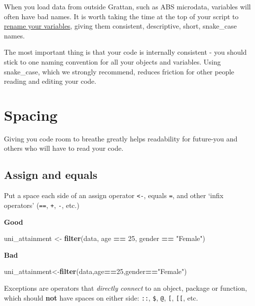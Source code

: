 \documentclass[]{book}
\newenvironment{Shaded}{\begin{snugshade}}{\end{snugshade}}
\newcommand{\DecValTok}[1]{\textcolor[rgb]{0.00,0.00,0.81}{#1}}
\newcommand{\KeywordTok}[1]{\textcolor[rgb]{0.13,0.29,0.53}{\textbf{#1}}}
\newcommand{\NormalTok}[1]{#1}
\newcommand{\OperatorTok}[1]{\textcolor[rgb]{0.81,0.36,0.00}{\textbf{#1}}}
\newcommand{\StringTok}[1]{\textcolor[rgb]{0.31,0.60,0.02}{#1}}
\begin{document}
When you load data from outside Grattan, such as ABS microdata, variables will often have bad names. It is worth taking the time at the top of your script to \href{https://dplyr.tidyverse.org/reference/select.html}{rename your variables}, giving them consistent, descriptive, short, snake\_case names.

The most important thing is that your code is internally consistent - you should stick to one naming convention for all your objects and variables. Using snake\_case, which we strongly recommend, reduces friction for other people reading and editing your code.

\hypertarget{spacing}{%
\chapter{Spacing}\label{spacing}}

Giving you code room to breathe greatly helps readability for future-you and others who will have to read your code.

\hypertarget{assign-and-equals}{%
\section{Assign and equals}\label{assign-and-equals}}

Put a space each side of an assign operator \texttt{\textless{}-}, equals \texttt{=}, and other `infix operators' (\texttt{==}, \texttt{+}, \texttt{-}, etc.)

\textbf{Good}

\begin{Shaded}
\begin{Highlighting}[]
\NormalTok{uni_attainment <-}\StringTok{ }\KeywordTok{filter}\NormalTok{(data, age }\OperatorTok{==}\StringTok{ }\DecValTok{25}\NormalTok{, gender }\OperatorTok{==}\StringTok{ "Female"}\NormalTok{)}
\end{Highlighting}
\end{Shaded}

\textbf{Bad}

\begin{Shaded}
\begin{Highlighting}[]
\NormalTok{uni_attainment<-}\KeywordTok{filter}\NormalTok{(data,age}\OperatorTok{==}\DecValTok{25}\NormalTok{,gender}\OperatorTok{==}\StringTok{"Female"}\NormalTok{)}
\end{Highlighting}
\end{Shaded}

Exceptions are operators that \emph{directly connect} to an object, package or function, which should \textbf{not} have spaces on either side: \texttt{::}, \texttt{\$}, \texttt{@}, \texttt{{[}}, \texttt{{[}{[}}, etc.
\end{document}
